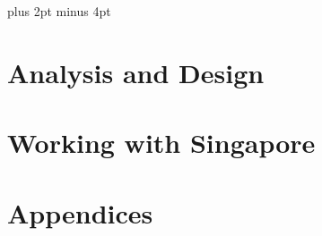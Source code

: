 \documentclass[a4paper,titlepage]{article}
\begin{document}
\parindent=0pt %
\parskip=8pt plus 2pt minus 4pt

\setcounter{page}{1}

\tableofcontents
\newpage

\begin{spacing}{1.15}


\section{Analysis and Design}







\pagebreak
\section{Working with Singapore}


\end{spacing}
\pagebreak


\newpage
\appendix
\section{Appendices}

\end{document}
